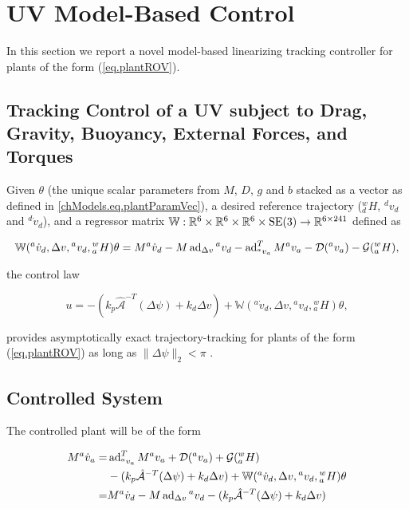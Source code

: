 
\section{UV Model-Based Control}
In this section we report a novel model-based linearizing tracking
controller for plants of the form (\ref{eq.plantROV}).

\subsection{Tracking Control of a UV subject to Drag, Gravity, 
  Buoyancy, External Forces, and Torques}\label{sec.ROVAID}

\noindent Given $\theta$ (the unique scalar parameters from $M$, $D$,
$g$ and $b$ stacked as a vector as defined in
\ref{chModels.eq.plantParamVec}), a desired reference trajectory
(${^w_d}H$, ${^d}v_d$ and ${^d}\dot{v}_d$), and a regressor matrix
$\mathbb{W}:\mathbb{R}^6\times\mathbb{R}^6\times\mathbb{R}^6\times\SE3\to
\mathbb{R}^{6 \times 241}$ defined as

\begin{equation}
\mathbb{W}({^a}\dot{v}_d,\Delta v, {^a}v_d , {^w_a}H)\theta =
    M{^a}\dot{v}_d - M\operatorname{ad}_{\Delta v}{^a}v_d -\operatorname{ad}_{{^a}v_a}^T M{^a}v_a
    -\mathcal{D}({^a}v_a)-\mathcal{G}({^w_a}H),
\end{equation}

\noindent the control law 

\begin{equation}
u=-(k_p\hat{\mathcal{A}}^{-T}(\Delta \psi)+k_d\Delta v)
+\mathbb{W}({^a}\dot{v}_d,\Delta v, {^a}v_d , {^w_a}H)\theta,
\end{equation}

provides asymptotically exact trajectory-tracking for plants of the
form (\ref{eq.plantROV}) as long as {\color{red} $\|\Delta \psi\|_2 <\pi$ }.


\subsection{Controlled System}

The controlled plant will be of the form

\begin{align}
  M{^a}\dot{v}_a=
     &\operatorname{ad}_{{^a}v_a}^T M{^a}v_a+\mathcal{D}({^a}v_a)+\mathcal{G}({^w_a}H)
\nonumber \\ 
      &-(k_p\hat{\mathcal{A}}^{-T}(\Delta \psi)+k_d\Delta v)
+\mathbb{W}({^a}\dot{v}_d,\Delta v, {^a}v_d , {^w_a}H)\theta
\nonumber \\
     =&M{^a}\dot{v}_d - M\operatorname{ad}_{\Delta v}{^a}v_d
      -(k_p\hat{\mathcal{A}}^{-T}(\Delta \psi)+k_d\Delta v)
\nonumber 
\end{align}

